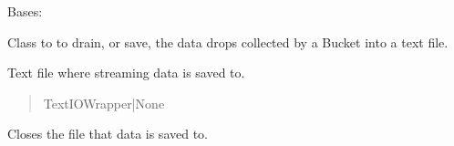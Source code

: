 \documentclass[letterpaper,10pt,english]{sphinxmanual}
\begin{document}
\begin{fulllineitems}
\label{\detokenize{PodApi.Stream.Drain:PodApi.Stream.Drain.ToText.DrainToTXT}}
\pysigstartsignatures
{}
\pysigstopsignatures
\sphinxAtStartPar
Bases: {\hyperref[\detokenize{PodApi.Stream.Drain:PodApi.Stream.Drain.ToFile.DrainToFile}]{}}

\sphinxAtStartPar
Class to to drain, or save, the data drops collected by a Bucket into a text file.

\begin{fulllineitems}
\label{\detokenize{PodApi.Stream.Drain:PodApi.Stream.Drain.ToText.DrainToTXT.file}}
\pysigstartsignatures
{}
\pysigstopsignatures
\sphinxAtStartPar
Text file where streaming data is saved to.
\begin{quote}\begin{description}
\sphinxAtStartPar
TextIOWrapper|None

\end{description}\end{quote}

\end{fulllineitems}


\begin{fulllineitems}
\label{\detokenize{PodApi.Stream.Drain:PodApi.Stream.Drain.ToText.DrainToTXT.CloseFile}}
\pysigstartsignatures
{}
\pysigstopsignatures
\sphinxAtStartPar
Closes the file that data is saved to.


\end{fulllineitems}
\end{fulllineitems}
\end{document}
